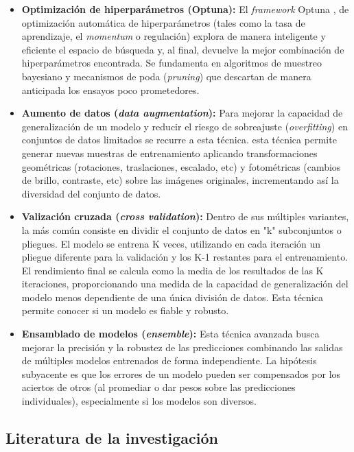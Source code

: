 \documentclass[12pt,a4paper,onecolumn,oneside]{report}
\begin{document}
\begin{itemize}
  \item \textbf{Optimización de hiperparámetros (Optuna):} El \textit{framework} Optuna \cite{optuna_github}, de optimización automática de hiperparámetros (tales como la tasa de aprendizaje, el \textit{momentum} o regulación) explora de manera inteligente y eficiente el espacio de búsqueda y, al final, devuelve la mejor combinación de hiperparámetros encontrada. Se fundamenta en algoritmos de muestreo bayesiano y mecanismos de poda (\textit{pruning}) que descartan de manera anticipada los ensayos poco prometedores.
  \item \textbf{Aumento de datos (\textit{data augmentation}):} Para mejorar la capacidad de generalización de un modelo y reducir el riesgo de sobreajuste (\textit{overfitting}) en conjuntos de datos limitados se recurre a esta técnica. esta técnica permite generar nuevas muestras de entrenamiento aplicando transformaciones geométricas (rotaciones, traslaciones, escalado, etc) y fotométricas (cambios de brillo, contraste, etc) sobre las imágenes originales, incrementando así la diversidad del conjunto de datos.
  \item \textbf{Valización cruzada (\textit{cross validation}):} Dentro de sus múltiples variantes, la más común consiste en dividir el conjunto de datos en "k" subconjuntos o pliegues. El modelo se entrena K veces, utilizando en cada iteración un pliegue diferente para la validación y los K-1 restantes para el entrenamiento. El rendimiento final se calcula como la media de los resultados de las K iteraciones, proporcionando una medida de la capacidad de generalización del modelo menos dependiente de una única división de datos. Esta técnica permite conocer si un modelo es fiable y robusto.
  \item \textbf{Ensamblado de modelos (\textit{ensemble}):} Esta técnica avanzada busca mejorar la precisión y la robustez de las predicciones combinando las salidas de múltiples modelos entrenados de forma independiente. La hipótesis subyacente es que los errores de un modelo pueden ser compensados por los aciertos de otros (al promediar o dar pesos sobre las predicciones individuales), especialmente si los modelos son diversos.
\end{itemize}

\subsection{Literatura de la investigación}
\end{document}
